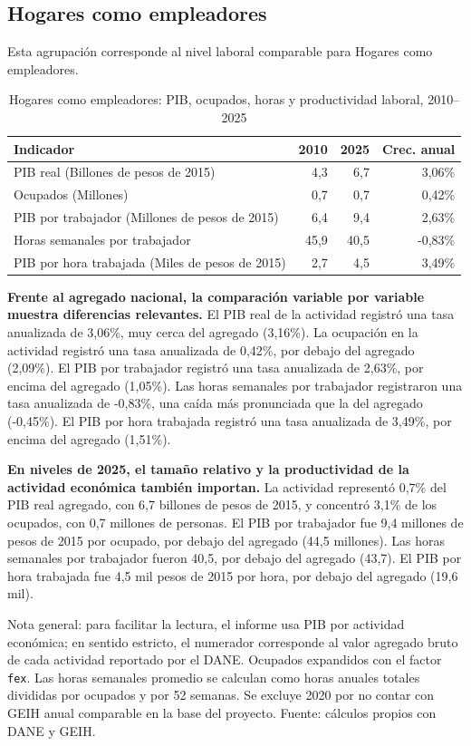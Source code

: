 \subsection{Hogares como empleadores}

Esta agrupación corresponde al nivel laboral comparable para Hogares como empleadores.

\begin{table}[H]
\centering
\caption{Hogares como empleadores: PIB, ocupados, horas y productividad laboral, 2010--2025}
\label{tab:agg25_t_productividad}
\small
\begin{tabular}{lrrr}
\toprule
Indicador & 2010 & 2025 & Crec. anual \\
\midrule
PIB real  (Billones de pesos de 2015) & 4,3 & 6,7 & 3,06\% \\
Ocupados (Millones) & 0,7 & 0,7 & 0,42\% \\
PIB por trabajador (Millones de pesos de 2015) & 6,4 & 9,4 & 2,63\% \\
Horas semanales por trabajador & 45,9 & 40,5 & -0,83\% \\
PIB por hora trabajada (Miles de pesos de 2015) & 2,7 & 4,5 & 3,49\% \\
\bottomrule
\end{tabular}
\end{table}

\textbf{Frente al agregado nacional, la comparación variable por variable muestra diferencias relevantes.} El PIB real de la actividad registró una tasa anualizada de 3,06\%, muy cerca del agregado (3,16\%). La ocupación en la actividad registró una tasa anualizada de 0,42\%, por debajo del agregado (2,09\%). El PIB por trabajador registró una tasa anualizada de 2,63\%, por encima del agregado (1,05\%). Las horas semanales por trabajador registraron una tasa anualizada de -0,83\%, una caída más pronunciada que la del agregado (-0,45\%). El PIB por hora trabajada registró una tasa anualizada de 3,49\%, por encima del agregado (1,51\%).

\textbf{En niveles de 2025, el tamaño relativo y la productividad de la actividad económica también importan.} La actividad representó 0,7\% del PIB real agregado, con 6,7 billones de pesos de 2015, y concentró 3,1\% de los ocupados, con 0,7 millones de personas. El PIB por trabajador fue 9,4 millones de pesos de 2015 por ocupado, por debajo del agregado (44,5 millones). Las horas semanales por trabajador fueron 40,5, por debajo del agregado (43,7). El PIB por hora trabajada fue 4,5 mil pesos de 2015 por hora, por debajo del agregado (19,6 mil).

{\footnotesize Nota general: para facilitar la lectura, el informe usa PIB por actividad económica; en sentido estricto, el numerador corresponde al valor agregado bruto de cada actividad reportado por el DANE. Ocupados expandidos con el factor \texttt{fex}. Las horas semanales promedio se calculan como horas anuales totales divididas por ocupados y por 52 semanas. Se excluye 2020 por no contar con GEIH anual comparable en la base del proyecto. Fuente: cálculos propios con DANE y GEIH.}
